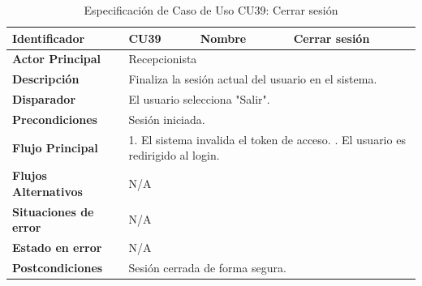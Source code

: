 \begingroup
\setlength{\parskip}{0pt}
\begin{longtable}{|p{3.5cm}|p{2cm}|p{2.5cm}|p{7cm}|}
\caption{Especificación de Caso de Uso CU39: Cerrar sesión}
\label{tab:cu39} \\
\hline
\textbf{Identificador} & CU39 & \textbf{Nombre} & Cerrar sesión \\ \hline
\textbf{Actor Principal} & \multicolumn{3}{p{11.5cm}|}{Recepcionista} \\ \hline
\textbf{Descripción} & \multicolumn{3}{p{11.5cm}|}{Finaliza la sesión actual del usuario en el sistema.} \\ \hline
\textbf{Disparador} & \multicolumn{3}{p{11.5cm}|}{El usuario selecciona "Salir".} \\ \hline
\textbf{Precondiciones} & \multicolumn{3}{p{11.5cm}|}{Sesión iniciada.} \\ \hline
\textbf{Flujo Principal} & \multicolumn{3}{p{11.5cm}|}{1. El sistema invalida el token de acceso. \newline 2. El usuario es redirigido al login.} \\ \hline
\textbf{Flujos Alternativos} & \multicolumn{3}{p{11.5cm}|}{N/A} \\ \hline
\textbf{Situaciones de error} & \multicolumn{3}{p{11.5cm}|}{N/A} \\ \hline
\textbf{Estado en error} & \multicolumn{3}{p{11.5cm}|}{N/A} \\ \hline
\textbf{Postcondiciones} & \multicolumn{3}{p{11.5cm}|}{Sesión cerrada de forma segura.} \\ \hline
\end{longtable}
\endgroup